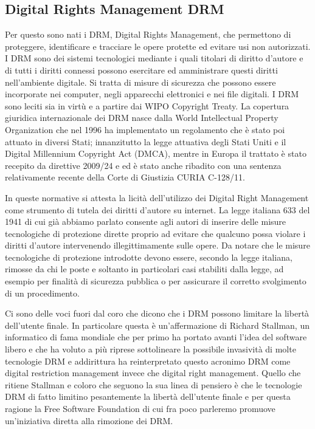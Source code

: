 \subsection{Digital Rights Management DRM}
Per questo sono nati i DRM, Digital Rights Management, che permettono di proteggere, identificare e tracciare le opere protette ed evitare usi non autorizzati. I DRM sono dei sistemi tecnologici mediante i quali titolari di diritto d'autore e di tutti i diritti connessi possono esercitare ed amministrare questi diritti nell'ambiente digitale. Si tratta di misure di sicurezza che possono essere incorporate nei computer, negli apparecchi elettronici e nei file digitali. 
I DRM sono leciti sia in virtù e a partire dai WIPO Copyright Treaty.
La copertura giuridica internazionale dei DRM nasce dalla World Intellectual Property Organization che nel 1996 ha implementato un regolamento che è stato poi attuato in diversi Stati; innanzitutto la legge attuativa degli Stati Uniti e il Digital Millennium Copyright Act (DMCA), mentre in Europa il trattato è stato recepito da direttive 2009/24 e ed è stato anche ribadito con una sentenza relativamente recente della Corte di Giustizia CURIA C-128/11. 

In queste normative si attesta la licità dell'utilizzo dei Digital Right Management come strumento di tutela dei diritti d'autore su internet. La legge italiana 633 del 1941 di cui già abbiamo parlato consente agli autori di inserire delle misure tecnologiche di protezione dirette proprio ad evitare che qualcuno possa violare i diritti d'autore intervenendo illegittimamente sulle opere. Da notare che le misure tecnologiche di protezione introdotte devono essere, secondo la legge italiana, rimosse da chi le poste e soltanto in particolari casi stabiliti dalla legge, ad esempio per finalità di sicurezza pubblica o per assicurare il corretto svolgimento di un procedimento. 

Ci sono delle voci fuori dal coro che dicono che i DRM possono limitare la libertà dell'utente finale. In particolare questa è un'affermazione di Richard Stallman, un informatico di fama mondiale che per primo ha portato avanti l'idea del software libero e che ha voluto a più riprese sottolineare la possibile invasività di molte tecnologie DRM e addirittura ha reinterpretato questo acronimo DRM come digital restriction management invece che digital right management. Quello che ritiene Stallman e coloro che seguono la sua linea di pensiero è che le tecnologie DRM di fatto limitino pesantemente la libertà dell'utente finale e per questa ragione la Free Software Foundation di cui fra poco parleremo promuove un'iniziativa diretta alla rimozione dei DRM. 

